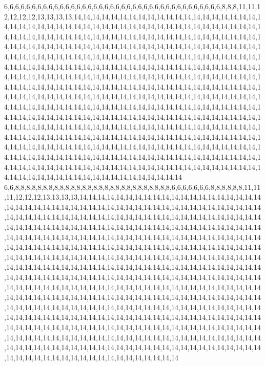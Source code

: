 6,6,6,6,6,6,6,6,6,6,6,6,6,6,6,6,6,6,6,6,6,6,6,6,6,6,6,6,6,6,6,6,6,6,6,6,6,6,6,8,8,8,11,11,12,12,12,12,13,13,13,13,14,14,14,14,14,14,14,14,14,14,14,14,14,14,14,14,14,14,14,14,14,14,14,14,14,14,14,14,14,14,14,14,14,14,14,14,14,14,14,14,14,14,14,14,14,14,14,14,14,14,14,14,14,14,14,14,14,14,14,14,14,14,14,14,14,14,14,14,14,14,14,14,14,14,14,14,14,14,14,14,14,14,14,14,14,14,14,14,14,14,14,14,14,14,14,14,14,14,14,14,14,14,14,14,14,14,14,14,14,14,14,14,14,14,14,14,14,14,14,14,14,14,14,14,14,14,14,14,14,14,14,14,14,14,14,14,14,14,14,14,14,14,14,14,14,14,14,14,14,14,14,14,14,14,14,14,14,14,14,14,14,14,14,14,14,14,14,14,14,14,14,14,14,14,14,14,14,14,14,14,14,14,14,14,14,14,14,14,14,14,14,14,14,14,14,14,14,14,14,14,14,14,14,14,14,14,14,14,14,14,14,14,14,14,14,14,14,14,14,14,14,14,14,14,14,14,14,14,14,14,14,14,14,14,14,14,14,14,14,14,14,14,14,14,14,14,14,14,14,14,14,14,14,14,14,14,14,14,14,14,14,14,14,14,14,14,14,14,14,14,14,14,14,14,14,14,14,14,14,14,14,14,14,14,14,14,14,14,14,14,14,14,14,14,14,14,14,14,14,14,14,14,14,14,14,14,14,14,14,14,14,14,14,14,14,14,14,14,14,14,14,14,14,14,14,14,14,14,14,14,14,14,14,14,14,14,14,14,14,14,14,14,14,14,14,14,14,14,14,14,14,14,14,14,14,14,14,14,14,14,14,14,14,14,14,14,14,14,14,14,14,14,14,14,14,14,14,14,14,14,14,14,14,14,14,14,14,14,14,14,14,14,14,14,14,14,14,14,14,14,14,14,14,14,14,14,14,14,14,14,14,14,14,14,14,14,14,14,14,14,14,14,14,14,14,14,14,14,14,14,14,14,14,14,14,14,14,14,14,14,14,14,14,14,14,14,14,14,14,14,14,14,14,14,14,14,14,14,14,14
6,6,8,8,8,8,8,8,8,8,8,8,8,8,8,8,8,8,8,8,8,8,8,8,8,8,8,8,8,8,6,6,6,6,6,6,6,8,8,8,8,8,8,11,11,11,12,12,12,13,13,13,13,14,14,14,14,14,14,14,14,14,14,14,14,14,14,14,14,14,14,14,14,14,14,14,14,14,14,14,14,14,14,14,14,14,14,14,14,14,14,14,14,14,14,14,14,14,14,14,14,14,14,14,14,14,14,14,14,14,14,14,14,14,14,14,14,14,14,14,14,14,14,14,14,14,14,14,14,14,14,14,14,14,14,14,14,14,14,14,14,14,14,14,14,14,14,14,14,14,14,14,14,14,14,14,14,14,14,14,14,14,14,14,14,14,14,14,14,14,14,14,14,14,14,14,14,14,14,14,14,14,14,14,14,14,14,14,14,14,14,14,14,14,14,14,14,14,14,14,14,14,14,14,14,14,14,14,14,14,14,14,14,14,14,14,14,14,14,14,14,14,14,14,14,14,14,14,14,14,14,14,14,14,14,14,14,14,14,14,14,14,14,14,14,14,14,14,14,14,14,14,14,14,14,14,14,14,14,14,14,14,14,14,14,14,14,14,14,14,14,14,14,14,14,14,14,14,14,14,14,14,14,14,14,14,14,14,14,14,14,14,14,14,14,14,14,14,14,14,14,14,14,14,14,14,14,14,14,14,14,14,14,14,14,14,14,14,14,14,14,14,14,14,14,14,14,14,14,14,14,14,14,14,14,14,14,14,14,14,14,14,14,14,14,14,14,14,14,14,14,14,14,14,14,14,14,14,14,14,14,14,14,14,14,14,14,14,14,14,14,14,14,14,14,14,14,14,14,14,14,14,14,14,14,14,14,14,14,14,14,14,14,14,14,14,14,14,14,14,14,14,14,14,14,14,14,14,14,14,14,14,14,14,14,14,14,14,14,14,14,14,14,14,14,14,14,14,14,14,14,14,14,14,14,14,14,14,14,14,14,14,14,14,14,14,14,14,14,14,14,14,14,14,14,14,14,14,14,14,14,14,14,14,14,14,14,14,14,14,14,14,14,14,14,14,14,14,14,14,14,14,14,14,14,14,14,14,14,14,14,14,14,14,14,14,14,14,14,14,14,14,14,14,14,14,14,14,14,14,14,14
